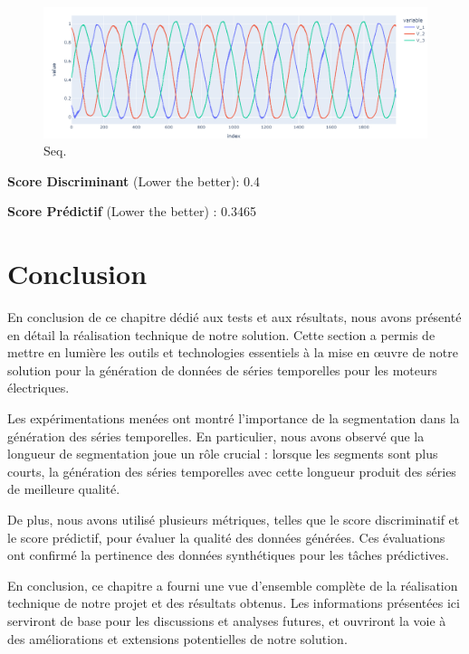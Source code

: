 \begin{figure}[hbt!]
  \centering
  \includegraphics[width=14cm]{images_pfe/fake_2000.png}
  \caption{Seq.}
  \label{fig:fake_1000}
\end{figure}
\FloatBarrier
\medskip

\textbf{Score Discriminant} (Lower the better): 0.4

\textbf{Score Prédictif}  (Lower the better) : 0.3465

\section{Conclusion}
En conclusion de ce chapitre dédié aux tests et aux résultats, nous avons
présenté en détail la réalisation technique de notre solution. Cette section a
permis de mettre en lumière les outils et technologies essentiels à la mise en
œuvre de notre solution pour la génération de données de séries temporelles
pour les moteurs électriques.

Les expérimentations menées ont montré l'importance de la segmentation dans la
génération des séries temporelles. En particulier, nous avons observé que la
longueur de segmentation joue un rôle crucial : lorsque les segments sont plus
courts, la génération des séries temporelles avec cette longueur produit des
séries de meilleure qualité.

De plus, nous avons utilisé plusieurs métriques, telles que le score
discriminatif et le score prédictif, pour évaluer la qualité des données
générées. Ces évaluations ont confirmé la pertinence des données synthétiques
pour les tâches prédictives.

En conclusion, ce chapitre a fourni une vue d'ensemble complète de la
réalisation technique de notre projet et des résultats obtenus. Les
informations présentées ici serviront de base pour les discussions et analyses
futures, et ouvriront la voie à des améliorations et extensions potentielles de
notre solution.